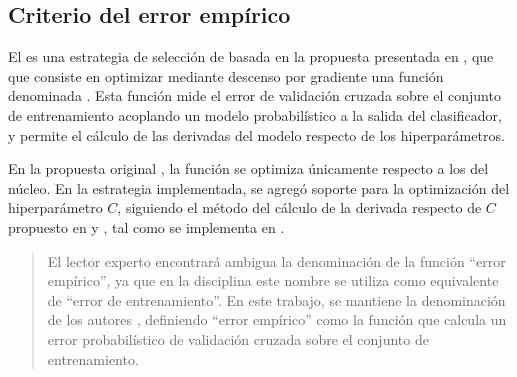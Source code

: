 %
%
\subsection{Criterio del error empírico}
%
El  es una estrategia de selección de
 basada en la propuesta presentada en \cite{ayat}, que que
consiste en optimizar mediante descenso por gradiente una función
denominada .
Esta función mide el error de validación cruzada sobre el conjunto de
entrenamiento acoplando un modelo probabilístico a la salida del
clasificador, y permite el cálculo de las derivadas del modelo
respecto de los hiperparámetros.

En la propuesta original \cite{ayat}, la función  se
optimiza únicamente respecto a los  del núcleo.
En la estrategia implementada, se agregó soporte para la optimización
del hiperparámetro $C$, siguiendo el método del cálculo de la derivada
respecto de $C$ propuesto en \cite{keerthi} y \cite{glasmachers}, tal
como se implementa en \cite{shark}.

%
\begin{quote}
  El lector experto encontrará ambigua la denominación de la función
  ``error empírico'', ya que en la disciplina este nombre se utiliza
  como equivalente de ``error de entrenamiento''.
  En este trabajo, se mantiene la denominación de los autores
  \cite{ayat}, definiendo ``error empírico'' como la función que
  calcula un error probabilístico de validación cruzada sobre el
  conjunto de entrenamiento.
\end{quote}
%
